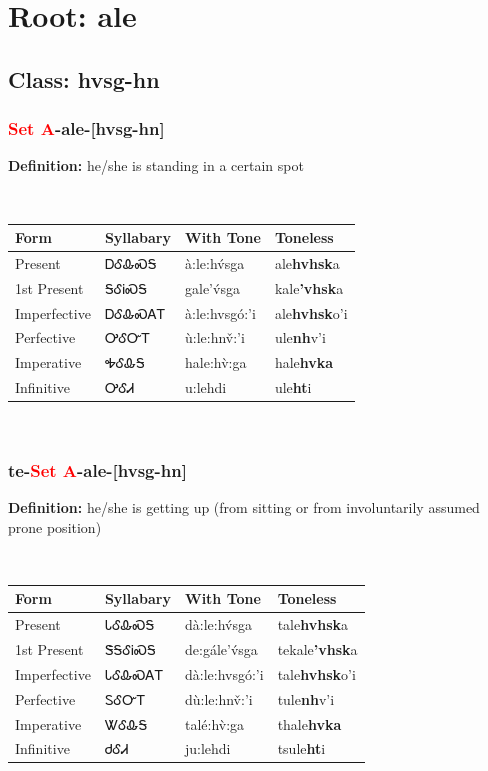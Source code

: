 \needspace{4in}
\section*{Root: ale}
\nopagebreak
{}
\needspace{3in}
\subsection*{Class: hvsg-hn}
\nopagebreak
\needspace{2in}
\subsubsection*{\textcolor{Red}{Set A}{-}\textbf{ale}{-}[hvsg-hn]}
\nopagebreak
\textbf{Definition: } he/she is standing in a certain spot
\\[0.5em]
\begin{tabularx}{\textwidth}{l X X X}%
\toprule%
\textbf{Form}&\textbf{Syllabary}&\textbf{With Tone}&\textbf{Toneless}\\%
\midrule%
Present&ᎠᎴᎲᏍᎦ&à:le:hv́sga&ale\textbf{hvhsk}a\\%
1st Present&ᎦᎴᎥᏍᎦ&gale’v́sga&kale\textbf{'vhsk}a\\%
Imperfective&ᎠᎴᎲᏍᎪᎢ&à:le:hvsgó:’i&ale\textbf{hvhsk}o'i\\%
Perfective&ᎤᎴᏅᎢ&ù:le:hnv̌:’i&ule\textbf{nh}v'i\\%
Imperative&ᎭᎴᎲᎦ&hale:hv̀:ga&hale\textbf{hvka}\\%
Infinitive&ᎤᎴᏗ&u:lehdi&ule\textbf{ht}i\\%
\bottomrule%
\end{tabularx}
\\[1em]
\needspace{2in}
\subsubsection*{te{-}\textcolor{Red}{Set A}{-}\textbf{ale}{-}[hvsg-hn]}
\nopagebreak
\textbf{Definition: } he/she is getting up (from sitting or from involuntarily assumed prone position)
\\[0.5em]
\begin{tabularx}{\textwidth}{l X X X}%
\toprule%
\textbf{Form}&\textbf{Syllabary}&\textbf{With Tone}&\textbf{Toneless}\\%
\midrule%
Present&ᏓᎴᎲᏍᎦ&dà:le:hv́sga&tale\textbf{hvhsk}a\\%
1st Present&ᏕᎦᎴᎥᏍᎦ&de:gále’v́sga&tekale\textbf{'vhsk}a\\%
Imperfective&ᏓᎴᎲᏍᎪᎢ&dà:le:hvsgó:’i&tale\textbf{hvhsk}o'i\\%
Perfective&ᏚᎴᏅᎢ&dù:le:hnv̌:’i&tule\textbf{nh}v'i\\%
Imperative&ᏔᎴᎲᎦ&talé:hv̀:ga&thale\textbf{hvka}\\%
Infinitive&ᏧᎴᏗ&ju:lehdi&tsule\textbf{ht}i\\%
\bottomrule%
\end{tabularx}
\\[1em]